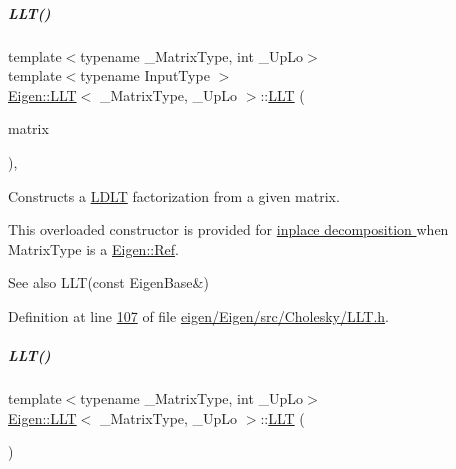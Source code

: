 \mbox{\label{group___cholesky___module_a1848a00addade9a0f7f70493c52ecc9d}} 
\subparagraph{\texorpdfstring{L\+L\+T()}{LLT()}\hspace{0.1cm}{\footnotesize\ttfamily [3/6]}}
{\footnotesize\ttfamily template$<$typename \+\_\+\+Matrix\+Type, int \+\_\+\+Up\+Lo$>$ \\
template$<$typename Input\+Type $>$ \\
\hyperlink{group___cholesky___module_class_eigen_1_1_l_l_t}{Eigen\+::\+L\+LT}$<$ \+\_\+\+Matrix\+Type, \+\_\+\+Up\+Lo $>$\+::\hyperlink{group___cholesky___module_class_eigen_1_1_l_l_t}{L\+LT} (\begin{DoxyParamCaption}\item[{\hyperlink{group___core___module_struct_eigen_1_1_eigen_base}{Eigen\+Base}$<$ Input\+Type $>$ \&}]{matrix }\end{DoxyParamCaption})\hspace{0.3cm}{\ttfamily [inline]}, {\ttfamily [explicit]}}



Constructs a \hyperlink{group___cholesky___module_class_eigen_1_1_l_d_l_t}{L\+D\+LT} factorization from a given matrix. 

This overloaded constructor is provided for \hyperlink{group___inplace_decomposition}{inplace decomposition } when {\ttfamily Matrix\+Type} is a \hyperlink{group___core___module_class_eigen_1_1_ref}{Eigen\+::\+Ref}.

\begin{DoxySeeAlso}{See also}
L\+L\+T(const Eigen\+Base\&) 
\end{DoxySeeAlso}


Definition at line \hyperlink{eigen_2_eigen_2src_2_cholesky_2_l_l_t_8h_source_l00107}{107} of file \hyperlink{eigen_2_eigen_2src_2_cholesky_2_l_l_t_8h_source}{eigen/\+Eigen/src/\+Cholesky/\+L\+L\+T.\+h}.

\mbox{\label{group___cholesky___module_a16d1ec9ea6497ba1febb242c2e8a7a96}} 
\subparagraph{\texorpdfstring{L\+L\+T()}{LLT()}\hspace{0.1cm}{\footnotesize\ttfamily [4/6]}}
{\footnotesize\ttfamily template$<$typename \+\_\+\+Matrix\+Type, int \+\_\+\+Up\+Lo$>$ \\
\hyperlink{group___cholesky___module_class_eigen_1_1_l_l_t}{Eigen\+::\+L\+LT}$<$ \+\_\+\+Matrix\+Type, \+\_\+\+Up\+Lo $>$\+::\hyperlink{group___cholesky___module_class_eigen_1_1_l_l_t}{L\+LT} (\begin{DoxyParamCaption}{ }\end{DoxyParamCaption})\hspace{0.3cm}{\ttfamily [inline]}}



